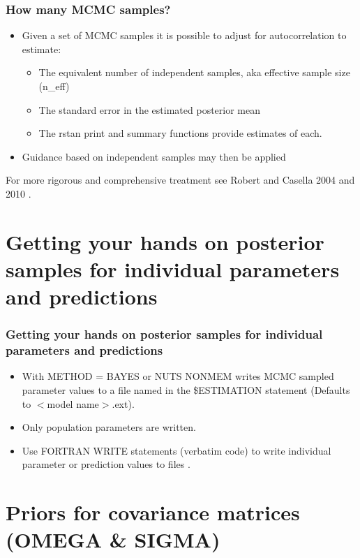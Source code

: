 \documentclass{beamer}
\begin{document}
\begin{frame}
  \frametitle{How many MCMC samples?}
  
\begin{itemize}
\item Given a set of MCMC samples it is possible to adjust for autocorrelation to estimate:
\begin{itemize}
\item The equivalent number of independent samples, aka effective
  sample size (n\_eff)
\item The standard error in the estimated posterior mean
\item The rstan print and summary functions provide estimates of each.
\end{itemize}
\item Guidance based on independent samples may then be applied
\end{itemize}
For more rigorous and comprehensive treatment see Robert and
  Casella 2004  and 2010 \cite{robertAndCasella2004,robertAndCasella2010}.

\end{frame}

\section[Getting posterior samples for individual parameters]{Getting
  your hands on posterior samples for individual parameters and
  predictions}

\begin{frame}
  \frametitle{Getting your hands on posterior samples for individual
    parameters and predictions}

  \begin{itemize}
  \item With METHOD = BAYES or NUTS NONMEM writes MCMC sampled
    parameter values to a file named in the \$ESTIMATION statement
    (Defaults to $<$model name$>$.ext).
  \item Only population parameters are written.
  \item Use FORTRAN WRITE statements (verbatim code) to write
    individual parameter or prediction values to files \cite[Example 8,
    pp. 277--280]{nonmem741}.
  \end{itemize}
  
\end{frame}

\section{Priors for covariance matrices (OMEGA \& SIGMA)}
\end{document}
